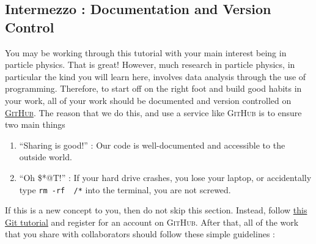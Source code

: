 \documentclass[UKenglish,texlive=2016]{\ATLASLATEXPATH atlasdoc}
\begin{document}
\begin{center}
\end{center}

\subsection{Intermezzo : Documentation and Version Control}
You may be working through this tutorial with your main interest being in particle physics.  That is great!  However, much research in particle physics, in particular the kind you will learn here, involves data analysis through the use of programming.  Therefore, to start off on the right foot and build good habits in your work, all of your work should be documented and version controlled on \href{https://github.com/}{\textsc{GitHub}}.  The reason that we do this, and use a service like \textsc{GitHub} is to ensure two main things 

\begin{enumerate}
\item ``Sharing is good!'' : Our code is well-documented and accessible to the outside world.  
\item ``Oh \$*@T!'' : If your hard drive crashes, you lose your laptop, or accidentally type \texttt{rm -rf ~/*} into the terminal, you are not screwed.
\end{enumerate}

If this is a new concept to you, then do not skip this section.  Instead, follow \href{https://try.github.io}{this Git tutorial} and register for an account on \textsc{GitHub}.  After that, all of the work that you share with collaborators should follow these simple guidelines :
\end{document}

